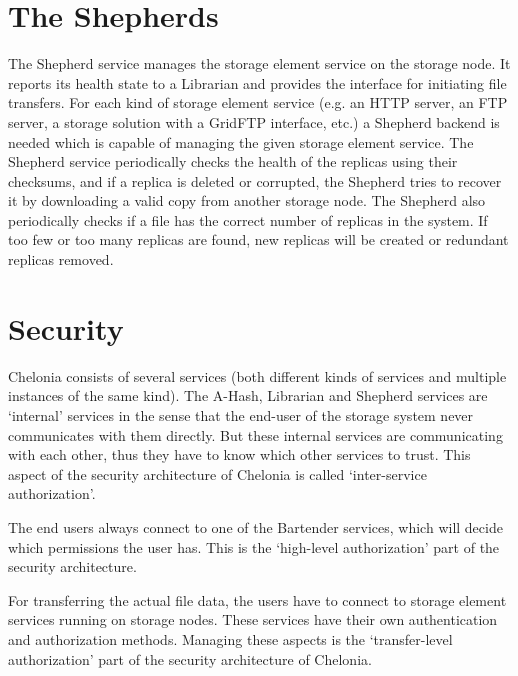 \documentclass{book}
\begin{document}

\section{The Shepherds} %
\label{sec:the_shepherds}

The Shepherd service manages the storage element service on the storage node. It reports its health state to a Librarian and provides the interface for initiating file transfers. For each kind of storage element service (e.g. an HTTP server, an FTP server, a storage solution with a GridFTP interface, etc.) a Shepherd backend is needed which is capable of managing the given storage element service. The Shepherd service periodically checks the health of the replicas using their checksums, and if a replica is deleted or corrupted, the Shepherd tries to recover it by downloading a valid copy from another storage node. The Shepherd also periodically checks if a file has the correct number of replicas in the system. If too few or too many replicas are found, new replicas will be created or redundant replicas removed.


\section{Security} %
\label{sec:security}

Chelonia consists of several services (both different kinds of services and multiple instances of the same kind). The A-Hash, Librarian and Shepherd services are `internal' services in the sense that the end-user of the storage system never communicates with them directly. But these internal services are communicating with each other, thus they have to know which other services to trust. This aspect of the security architecture of Chelonia is called `inter-service authorization'.

The end users always connect to one of the Bartender services, which will decide which permissions the user has. This is the `high-level authorization' part of the security architecture.

For transferring the actual file data, the users have to connect to storage element services running on storage nodes. These services have their own authentication and authorization methods. Managing these aspects is the `transfer-level authorization' part of the security architecture of Chelonia.
\end{document}
